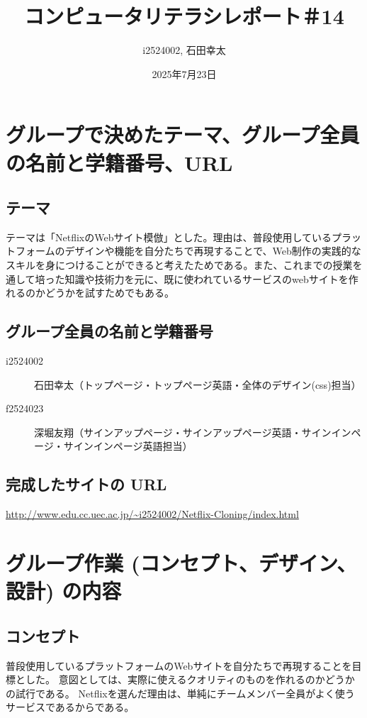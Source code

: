 \documentclass[12pt,a4j]{jarticle}
\begin{document}
\title{コンピュータリテラシレポート＃14}
\author{i2524002, 石田幸太}
\date{2025年7月23日}
\maketitle

\section{グループで決めたテーマ、グループ全員の名前と学籍番号、URL}

\subsection{テーマ}
テーマは「NetflixのWebサイト模倣」とした。理由は、普段使用しているプラットフォームのデザインや機能を自分たちで再現することで、Web制作の実践的なスキルを身につけることができると考えたためである。また、これまでの授業を通して培った知識や技術力を元に、既に使われているサービスのwebサイトを作れるのかどうかを試すためでもある。

\subsection{グループ全員の名前と学籍番号}

\begin{description}
\item[i2524002] 石田幸太（トップページ・トップページ英語・全体のデザイン(css)担当）
\item[f2524023] 深堀友翔（サインアップページ・サインアップページ英語・サインインページ・サインインページ英語担当）
\end{description}

\subsection{完成したサイトの URL}

\url{http://www.edu.cc.uec.ac.jp/~i2524002/Netflix-Cloning/index.html}


\section{グループ作業 (コンセプト、デザイン、設計) の内容}

\subsection{コンセプト}
普段使用しているプラットフォームのWebサイトを自分たちで再現することを目標とした。
意図としては、実際に使えるクオリティのものを作れるのかどうかの試行である。
Netflixを選んだ理由は、単純にチームメンバー全員がよく使うサービスであるからである。
\end{document}
